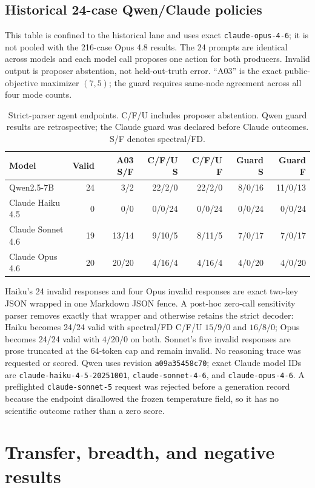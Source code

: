 \documentclass{article}
\begin{document}
\subsection{Historical 24-case Qwen/Claude policies}
This table is confined to the historical lane and uses exact \texttt{claude-opus-4-6}; it is not
pooled with the 216-case Opus 4.8 results.
The 24 prompts are identical across models and each model call proposes one action for both
producers. Invalid output is proposer abstention, not held-out-truth error. ``A03'' is the exact public-
objective maximizer $(7,5)$; the guard requires same-node agreement across all four mode counts.
\begin{table}[ht]
\centering\scriptsize
\caption{Strict-parser agent endpoints. C/F/U includes proposer abstention. Qwen guard results are
retrospective; the Claude guard was declared before Claude outcomes. S/F denotes spectral/FD.}
\begin{tabular}{lrrrrrr}
\toprule
Model & Valid & A03 S/F & C/F/U S & C/F/U F & Guard S & Guard F \\
\midrule
Qwen2.5-7B & 24 & 3/2 & 22/2/0 & 22/2/0 & 8/0/16 & 11/0/13 \\
Claude Haiku 4.5 & 0 & 0/0 & 0/0/24 & 0/0/24 & 0/0/24 & 0/0/24 \\
Claude Sonnet 4.6 & 19 & 13/14 & 9/10/5 & 8/11/5 & 7/0/17 & 7/0/17 \\
Claude Opus 4.6 & 20 & 20/20 & 4/16/4 & 4/16/4 & 4/0/20 & 4/0/20 \\
\bottomrule
\end{tabular}
\end{table}

Haiku's 24 invalid responses and four Opus invalid responses are exact two-key JSON wrapped in one
Markdown JSON fence. A post-hoc zero-call sensitivity parser removes exactly that wrapper and
otherwise retains the strict decoder: Haiku becomes 24/24 valid with spectral/FD C/F/U
$15/9/0$ and $16/8/0$; Opus becomes 24/24 valid with $4/20/0$ on both. Sonnet's five invalid
responses are prose truncated at the 64-token cap and remain invalid. No reasoning trace was
requested or scored. Qwen uses revision \texttt{a09a35458c70}; exact Claude model IDs are
\texttt{claude-haiku-4-5-20251001}, \texttt{claude-sonnet-4-6}, and
\texttt{claude-opus-4-6}. A preflighted \texttt{claude-sonnet-5} request was rejected before a
generation record because the endpoint disallowed the frozen temperature field, so it has no
scientific outcome rather than a zero score.

\section{Transfer, breadth, and negative results}
\end{document}
